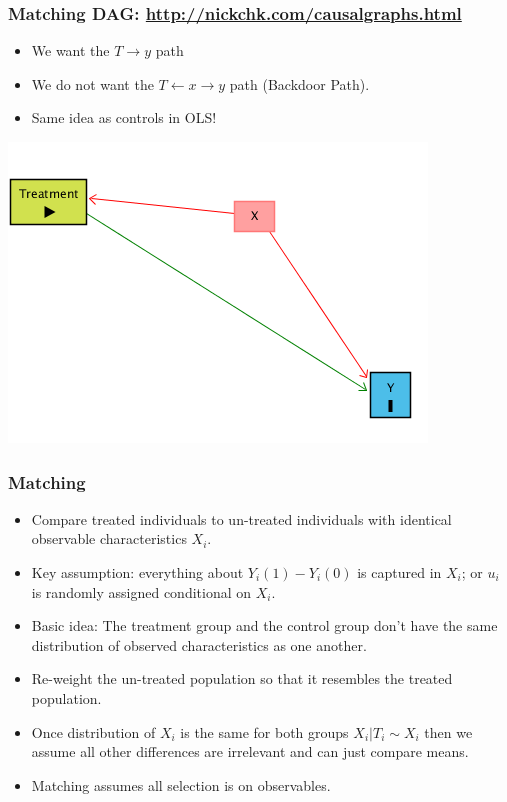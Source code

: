 \documentclass[xcolor=pdftex,dvipsnames,table,mathserif,aspectratio=169]{beamer}
\begin{document}
\begin{frame}
\frametitle{Matching DAG: \url{http://nickchk.com/causalgraphs.html}}
\begin{itemize}
\item We want the $T \rightarrow y$ path
\item We do not want the $T \leftarrow x \rightarrow y$ path (\alert{Backdoor Path}).
\item Same idea as controls in OLS!
\end{itemize}

\begin{center}
\includegraphics[height=0.7\textheight]{./resources/dag-match.png}
\end{center}
\end{frame}



\begin{frame}
\frametitle{Matching}
\begin{itemize}
\item Compare treated individuals to un-treated individuals with identical observable characteristics $X_i$.
\item Key assumption: everything about $Y_i(1) - Y_i(0)$ is captured in $X_i$; or $u_i$ is randomly assigned conditional on $X_i$.
\item Basic idea: The treatment group and the control group don't have the same distribution of observed characteristics as one another. 
\item \alert{Re-weight} the un-treated population so that it resembles the treated population.
\item Once distribution of $X_i$ is the same for both groups $ X_i | T_i \sim X_i$ then we assume all other differences are irrelevant and can just compare means.
\item Matching assumes \alert{all selection is on observables}.
\end{itemize}
\end{frame}
\end{document}

